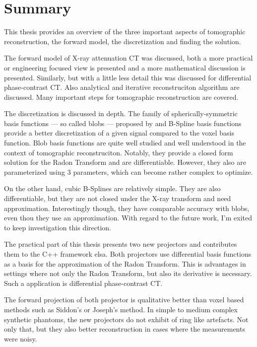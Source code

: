 \chapter{Summary}\label{chap:summary}

This thesis provides an overview of the three important aspects of tomographic reconstruction, the
forward model, the discretization and finding the solution.

The forward model of X-ray attenuation CT was discussed, both a more practical or engineering
focused view is presented and a more mathematical discussion is presented. Similarly, but with a
little less detail this was discussed for differential phase-contrast CT\@. Also analytical and
iterative reconstruciton algorithm are discussed. Many important steps for tomographic
reconstruction are covered.

The discretization is discussed in depth. The family of spherically-symmetric basis functions --- so
called blobs --- proposed by \citeauthor*{lewitt_multidimensional_1990} and B-Spline basis functions
provide a better discretization of a given signal compared to the voxel basis function. Blob basis
functions are quite well studied and well understood in the context of tomographic reconstruciton.
Notably, they provide a closed form solution for the Radon Transform and are differentiable.
However, they also are parameterized using \(3\) parameters, which can become rather complex to
optimize.

On the other hand, cubic B-Splines are relatively simple. They are also differentiable, but they are
not closed under the X-ray transform and need approximation. Interestingly though, they have
comparable accuracy with blobs, even thou they use an approximation. With regard to the future work,
I'm exited to keep investigation this direction.

The practical part of this thesis presents two new projectors and contributes them to the C++
framework elsa. Both projectors use differential basis functions as a basis for the approximation of
the Radon Transform. This is advantages in settings where not only the Radon Transform, but also its
derivative is necessary. Such a application is differential phase-contrast CT\@.

The forward projection of both projector is qualitative better than voxel based methods such as
Siddon's or Joseph's method. In simple to medium complex synthetic phantoms, the new projectors do
not exhibit of ring like artefacts. Not only that, but they also better reconstruction in cases
where the measurements were noisy.

